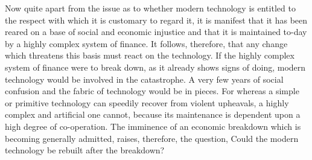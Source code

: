 \documentclass{book}
\begin{document}
Now quite apart from the issue as to whether modern technology is entitled to the respect with which it is customary to regard it, it is manifest that it has been reared on a base of social and economic injustice and that it is maintained to-day by a highly complex system of finance. It follows, therefore, that any change which threatens this basis must react on the technology. If the highly complex system of finance were to break down, as it already shows signs of doing, modern technology would be involved in the catastrophe. A very few years of social confusion and the fabric of technology would be in pieces. For whereas a simple or primitive technology can speedily recover from violent upheavals, a highly complex and artificial one cannot, because its maintenance is dependent upon a high degree of co-operation. The imminence of an economic breakdown which is becoming generally admitted, raises, therefore, the question, Could the modern technology be rebuilt after the breakdown?
\end{document}
